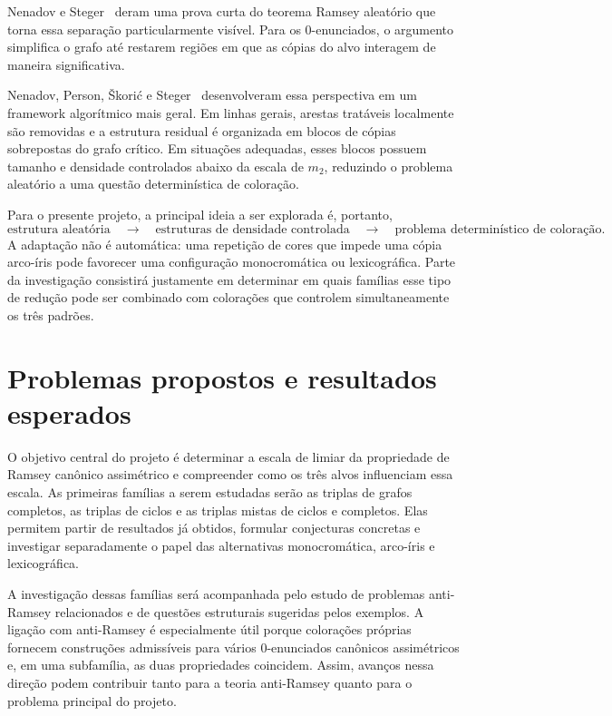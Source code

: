 \documentclass[11pt,a4paper]{article}
\theoremstyle{plain}
\theoremstyle{definition}
\begin{document}
Nenadov e Steger~\cite{NS} deram uma prova curta do teorema Ramsey
aleatório que torna essa separação particularmente visível. Para os
$0$-enunciados, o argumento simplifica o grafo até restarem regiões
em que as cópias do alvo interagem de maneira significativa.

Nenadov, Person, Škorić e Steger~\cite{NPSS} desenvolveram essa
perspectiva em um framework algorítmico mais geral. Em linhas gerais,
arestas tratáveis localmente são removidas e a estrutura residual é
organizada em blocos de cópias sobrepostas do grafo crítico. Em
situações adequadas, esses blocos possuem tamanho e densidade
controlados abaixo da escala de $m_2$, reduzindo o problema aleatório
a uma questão determinística de coloração.

Para o presente projeto, a principal ideia a ser explorada é,
portanto,
\[
  \text{estrutura aleatória}
  \quad\longrightarrow\quad
  \text{estruturas de densidade controlada}
  \quad\longrightarrow\quad
  \text{problema determinístico de coloração}.
\]
A adaptação não é automática: uma repetição de cores que impede uma
cópia arco-íris pode favorecer uma configuração monocromática ou
lexicográfica. Parte da investigação consistirá justamente em
determinar em quais famílias esse tipo de redução pode ser combinado
com colorações que controlem simultaneamente os três padrões.

\section{Problemas propostos e resultados esperados}


\label{sec:problemas}
\label{sec:resultados}


O objetivo central do projeto é determinar a escala de limiar da
propriedade de Ramsey canônico assimétrico e compreender como os três
alvos influenciam essa escala. As primeiras famílias a serem estudadas
serão as triplas de grafos completos, as triplas de ciclos e as triplas
mistas de ciclos e completos. Elas permitem partir de resultados já
obtidos, formular conjecturas concretas e investigar separadamente o
papel das alternativas monocromática, arco-íris e lexicográfica.

A investigação dessas famílias será acompanhada pelo estudo de
problemas anti-Ramsey relacionados e de questões estruturais sugeridas
pelos exemplos. A ligação com anti-Ramsey é especialmente útil porque
colorações próprias fornecem construções admissíveis para vários
$0$-enunciados canônicos assimétricos e, em uma subfamília, as duas
propriedades coincidem. Assim, avanços nessa direção podem contribuir
tanto para a teoria anti-Ramsey quanto para o problema principal do
projeto.
\end{document}
